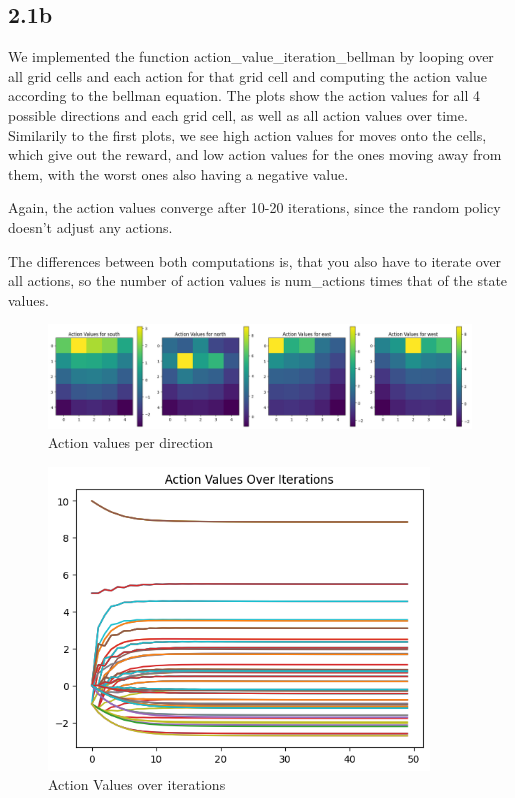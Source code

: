 \documentclass{article} %
\begin{document}
	\newpage
	\subsection{2.1b}
	We implemented the function action\_value\_iteration\_bellman by looping over all grid cells and each action for that grid cell and computing the action value according to the bellman equation. 
	The plots show the action values for all 4 possible directions and each grid cell, as well as all action values over time. Similarily to the first plots, we see high action values for moves onto the cells, which give out the reward, and low action values for the ones moving away from them, with the worst ones also having a negative value.
	
	Again, the action values converge after 10-20 iterations, since the random policy doesn't adjust any actions. 

	The differences between both computations is, that you also have to iterate over all actions, so the number of action values is num\_actions times that of the state values. 
	\newline
	
	\begin{figure}[h!]
		\centering
		\includegraphics[width=1\textwidth]{images/action_values_per_direction.png}
		\caption{Action values per direction}
		\label{fig:3}
	\end{figure}
	
		\begin{figure}[h!]
		\centering
		\includegraphics[width=0.9\textwidth]{images/action_values.png}
		\caption{Action Values over iterations}
		\label{fig:4}
	\end{figure}
	
\end{document}
